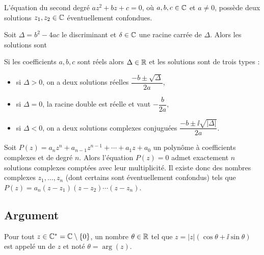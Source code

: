 \documentclass[10pt,class=article,crop=false]{standalone}
\begin{document}
\begin{multicols}{2}
\begin{proposition}
	L'équation du second degré $az^2 + bz + c = 0$, o\`u $a, b, c \in
	\mathbb{C}$ et $a \neq 0$, possède deux solutions $z_1, z_2 \in \mathbb{C}$
	éventuellement confondues.
	
	Soit $\Delta = b^2 - 4 ac$ le discriminant et
	$\delta \in \mathbb{C}$ une racine carrée de $\Delta$. Alors les
	solutions sont
\end{proposition}

\begin{corollaire}
	Si les coefficients $a, b, c$ sont réels alors $\Delta \in \mathbb{R}$ et les solutions sont de trois types :
	\begin{itemize}
		\item si $\Delta > 0$, on a deux solutions réelles $\dfrac{- b \pm\sqrt{\Delta}}{2 a}$,		
		
		\item si $\Delta = 0$, la racine double est réelle et vaut $-\dfrac{b}{2 a}$,
		
		\item si $\Delta < 0$, on a deux solutions complexes conjuguées $\dfrac{- b \pm \ii  \sqrt{|\Delta|}}{2 a}$.
	\end{itemize}
\end{corollaire}

\begin{theoreme}
	Soit $P (z) = a_n z^n + a_{n - 1} z^{n - 1}
	+ \cdots + a_1 z + a_0$ un polyn\^ome \`a coefficients complexes
	et de degré $n$. Alors l'équation $P(z) = 0$ admet exactement $n$
	solutions complexes comptées avec leur multiplicité.
	Il existe donc des nombres complexes $z_1, \ldots, z_n$ (dont certains sont
	éventuellement confondus) tels que $P (z) = a_n  \left( z - z_1 \right) \left( z - z_2 \right) 	\cdots \left( z - z_n \right)$.
\end{theoreme}


\subsection{Argument}


Pour tout $z \in \mathbb{C}^{\ast} =\mathbb{C} \setminus \left\{ 0 \right\}$,
un nombre $\theta \in \mathbb{R}$ tel que $z = \left| z
\right|  \left( \cos \theta + \ii  \sin \theta \right)$ est appelé un 
de $z$ et noté $\theta = \arg (z)$.



\end{multicols}
\end{document}
